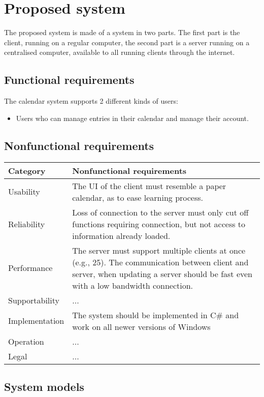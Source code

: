 \section{Proposed system}
The proposed system is made of a system in two parts. The first part is the client, running on a regular computer, the second part is a server running on a centralised computer, available to all running clients through the internet.
\subsection{Functional requirements}
The calendar system supports 2 different kinds of users:
\begin{itemize}
\item Users who can manage entries in their calendar and manage their account.
\end{itemize}
\subsection{Nonfunctional requirements}

\begin{center}
    \begin{tabular}{ | l | p{10cm} |}
    \hline
    Category & Nonfunctional requirements \\ \hline
    Usability & The UI of the client must resemble a paper calendar, as to ease learning process.\\ \hline
    Reliability & Loss of connection to the server must only cut off functions requiring connection, but not access to information already loaded.\\ \hline
    Performance & The server must support multiple clients at once (e.g., 25).
	The communication between client and server, when updating a server should be fast even with a low bandwidth connection. \\ \hline
	Supportability & ... \\ \hline
	Implementation & The system should be implemented in C\# and work on all newer versions of Windows \\ \hline
	Operation & ... \\ \hline
	Legal & ... \\ \hline
    \end{tabular}
\end{center}
\subsection{System models}

